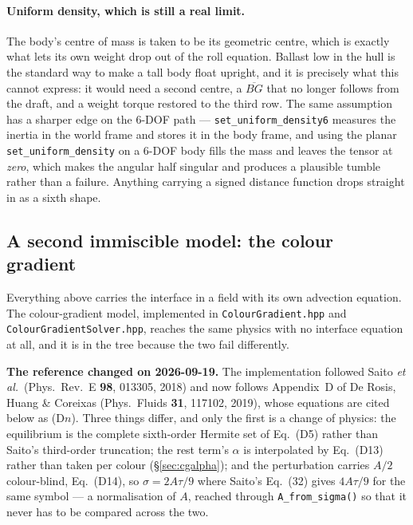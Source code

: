 \documentclass[11pt,a4paper]{article}
\newcommand{\code}[1]{\texttt{\small #1}}
\begin{document}
\paragraph{Uniform density, which is still a real limit.} The body's centre of
mass is taken to be its geometric centre, which is exactly what lets its own
weight drop out of the roll equation. Ballast low in the hull is the standard way
to make a tall body float upright, and it is precisely what this cannot express:
it would need a second centre, a $\overline{BG}$ that no longer follows from the
draft, and a weight torque restored to the third row. The same assumption has a
sharper edge on the 6-DOF path --- \code{set\_uniform\_density6} measures the
inertia in the world frame and stores it in the body frame, and using the planar
\code{set\_uniform\_density} on a 6-DOF body fills the mass and leaves the tensor
at \emph{zero}, which makes the angular half singular and produces a plausible
tumble rather than a failure. Anything carrying a signed distance function drops
straight in as a sixth shape.


\subsection{A second immiscible model: the colour gradient}\label{sec:colour}

Everything above carries the interface in a field with its own advection
equation. The colour-gradient model, implemented in \code{ColourGradient.hpp} and
\code{ColourGradientSolver.hpp}, reaches the same physics with no interface
equation at all, and it is in the tree because the two fail differently.

\textbf{The reference changed on 2026-09-19.} The implementation followed Saito
\emph{et al.}\ (Phys.\ Rev.\ E \textbf{98}, 013305, 2018) and now follows
Appendix~D of De Rosis, Huang \& Coreixas (Phys.\ Fluids \textbf{31}, 117102,
2019), whose equations are cited below as (D$n$). Three things differ, and only
the first is a change of physics: the equilibrium is the complete sixth-order
Hermite set of Eq.~(D5) rather than Saito's third-order truncation; the rest
term's $\alpha$ is interpolated by Eq.~(D13) rather than taken per colour
(\S\ref{sec:cgalpha}); and the perturbation carries $A/2$ colour-blind,
Eq.~(D14), so $\sigma = 2A\tau/9$ where Saito's Eq.~(32) gives $4A\tau/9$ for
the same symbol --- a normalisation of $A$, reached through
\code{A\_from\_sigma()} so that it never has to be compared across the two.
\end{document}
